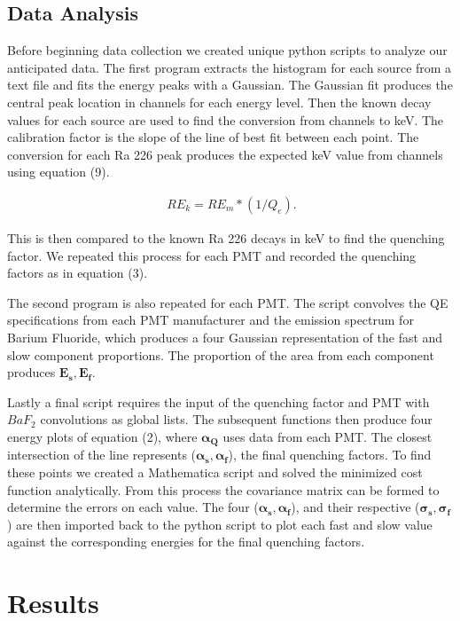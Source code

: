 \documentclass[aip, jmp, amssymb, amsmath, reprint, floatfix]{revtex4-1}
\begin{document}
\subsection{\label{sec:level2}Data Analysis}

Before beginning data collection we created unique python scripts to analyze our anticipated data. The first program extracts the histogram for each source from a text file and fits the energy peaks with a Gaussian. The Gaussian fit produces the central peak location in channels for each energy level. Then the known decay values for each source are used to find the conversion from channels to keV. The calibration factor is the slope of the line of best fit between each point. The conversion for each Ra 226 peak produces the expected keV value from channels using equation (9).

\begin{eqnarray}
\ RE_k = RE_m * (1/Q_e)
\label{eq:nine}.
\end{eqnarray}

This is then compared to the known Ra 226 decays in keV to find the quenching factor. We repeated this process for each PMT and recorded the quenching factors as in equation (3). 

The second program is also repeated for each PMT. The script convolves the QE specifications from each PMT manufacturer and the emission spectrum for Barium Fluoride, which produces a four Gaussian representation of the fast and slow component proportions. The proportion of the area from each component produces $\bm{E_s, E_f}$. 

Lastly a final script requires the input of the quenching factor and PMT with $BaF_2$ convolutions as global lists. The subsequent functions then produce four energy plots of equation (2), where $\bm{\alpha_Q}$ uses data from each PMT. The closest intersection of the line represents ($\bm{\alpha_s, \alpha_f}$), the final quenching factors. To find these points we created a Mathematica script and solved the minimized cost function analytically. From this process the covariance matrix can be formed to determine the errors on each value. The four ($\bm{\alpha_s, \alpha_f}$), and their respective ($\bm{\sigma_s, \sigma_f}$) are then imported back to the python script to plot each fast and slow value against the corresponding energies for the final quenching factors. 


\section{\label{sec:level1}Results}
\end{document}
